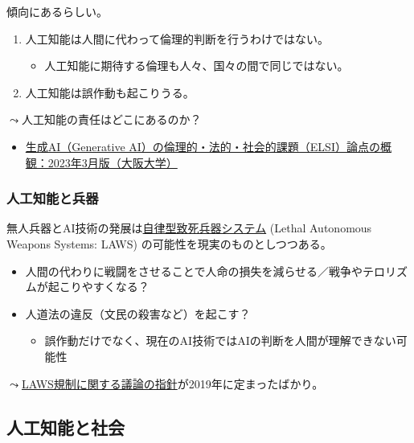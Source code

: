 \documentclass[
  xelatex,
  ja=standard]{bxjsarticle}
\providecommand{\tightlist}{%
  \setlength{\itemsep}{0pt}\setlength{\parskip}{0pt}}\usepackage{longtable,booktabs,array}
\begin{document}
傾向にあるらしい。

\begin{enumerate}
\def\labelenumi{\arabic{enumi}.}
\tightlist
\item
  人工知能は人間に代わって倫理的判断を行うわけではない。

  \begin{itemize}
  \tightlist
  \item
    人工知能に期待する倫理も人々、国々の間で同じではない。
  \end{itemize}
\item
  人工知能は誤作動も起こりうる。
\end{enumerate}

\(\leadsto\)人工知能の責任はどこにあるのか？

\begin{itemize}
\tightlist
\item
  \href{https://elsi.osaka-u.ac.jp/research/2120}{生成AI（Generative
  AI）の倫理的・法的・社会的課題（ELSI）論点の概観：2023年3月版（大阪大学）}
\end{itemize}

\hypertarget{ux4ebaux5de5ux77e5ux80fdux3068ux5175ux5668}{%
\subsubsection{人工知能と兵器}\label{ux4ebaux5de5ux77e5ux80fdux3068ux5175ux5668}}

無人兵器とAI技術の発展は\href{https://www.mofa.go.jp/mofaj/dns/ca/page24_001191.html}{自律型致死兵器システム}
(Lethal Autonomous Weapons Systems: LAWS)
の可能性を現実のものとしつつある。

\begin{itemize}
\tightlist
\item
  人間の代わりに戦闘をさせることで人命の損失を減らせる／戦争やテロリズムが起こりやすくなる？
\item
  人道法の違反（文民の殺害など）を起こす？

  \begin{itemize}
  \tightlist
  \item
    誤作動だけでなく、現在のAI技術ではAIの判断を人間が理解できない可能性
  \end{itemize}
\end{itemize}

\(\leadsto\)\href{https://jsil.jp/archives/expert/2020-10}{LAWS規制に関する議論の指針}が2019年に定まったばかり。

\hypertarget{ux4ebaux5de5ux77e5ux80fdux3068ux793eux4f1a}{%
\subsection{人工知能と社会}\label{ux4ebaux5de5ux77e5ux80fdux3068ux793eux4f1a}}
\end{document}

